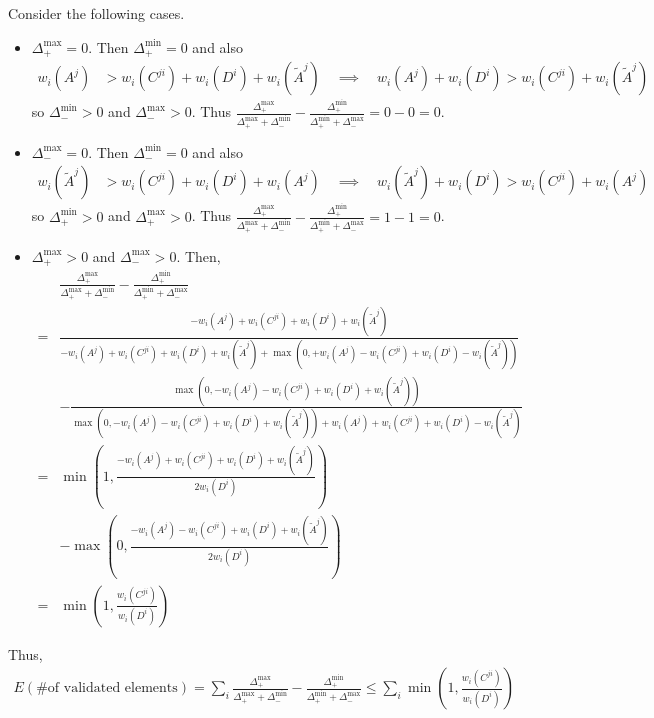 \documentclass{article} %
\begin{document}
Consider the following cases.
\begin{itemize}
\item $\Delta_+^{\max} = 0$. Then $\Delta_+^{\min} = 0$ and also
\begin{align*}
w_i(A^j) &> w_i(C^{ji})+ w_i(D^i) + w_i(\tilde{A}^j)
\quad\implies\quad w_i(A^j) + w_i(D^i) > w_i(C^{ji}) + w_i(\tilde{A}^j)
\end{align*}
so $\Delta_-^{\min} > 0$ and $\Delta_-^{\max}>0$.
Thus $\frac{\Delta_+^{\max}}{\Delta_+^{\max} + \Delta_-^{\min}} - \frac{\Delta_+^{\min}}{\Delta_+^{\min} + \Delta_-^{\max}} = 0-0 = 0$.

\item $\Delta_-^{\max} = 0$. Then $\Delta_-^{\min} = 0$ and also
\begin{align*}
w_i(\tilde{A}^j) &> w_i(C^{ji})+ w_i(D^i) + w_i(A^j)
\quad\implies\quad w_i(\tilde{A}^j) + w_i(D^i) > w_i(C^{ji}) + w_i(A^j)
\end{align*}
so $\Delta_+^{\min} > 0$ and $\Delta_+^{\max} > 0$.
Thus $\frac{\Delta_+^{\max}}{\Delta_+^{\max} + \Delta_-^{\min}} - \frac{\Delta_+^{\min}}{\Delta_+^{\min} + \Delta_-^{\max}} = 1-1 = 0$.

\item $\Delta_+^{\max}>0$ and $\Delta_-^{\max}>0$.
Then,
\begin{align*}
&\frac{\Delta_+^{\max}}{\Delta_+^{\max} + \Delta_-^{\min}} - \frac{\Delta_+^{\min}}{\Delta_+^{\min} + \Delta_-^{\max}} \\
=& \frac{- w_i(A^j) + w_i(C^{ji}) + w_i(D^i) + w_i(\tilde{A}^j)}{- w_i(A^j) + w_i(C^{ji}) + w_i(D^i) + w_i(\tilde{A}^j) + \max(0, + w_i(A^j) - w_i(C^{ji}) + w_i(D^i) - w_i(\tilde{A}^j))}\\
 &- \frac{\max(0, - w_i(A^j) -w_i(C^{ji}) + w_i(D^i) + w_i(\tilde{A}^j))}{\max(0, - w_i(A^j) -w_i(C^{ji}) + w_i(D^i) + w_i(\tilde{A}^j)) + w_i(A^j) + w_i(C^{ji}) + w_i(D^i) - w_i(\tilde{A}^j)}\\
=& \min\left(1,\frac{ - w_i(A^j) + w_i(C^{ji}) + w_i(D^i) + w_i(\tilde{A}^j)}{2w_i(D^i)}\right)\\
 & -\max\left(0,\frac{- w_i(A^j) - w_i(C^{ji}) + w_i(D^i) + w_i(\tilde{A}^j)}{2w_i(D^i)}\right)\\
=& \min\left(1,\frac{ w_i(C^{ji})}{w_i(D^i)}\right)
\end{align*}
\end{itemize}

Thus,
\begin{align*}
E(\text{\# of validated elements})
= \sum_i\frac{\Delta_+^{\max}}{\Delta_+^{\max} + \Delta_-^{\min}} - \frac{\Delta_+^{\min}}{\Delta_+^{\min} + \Delta_-^{\max}}
\leq \sum_i \min\left(1,\frac{ w_i(C^{ji})}{w_i(D^i)}\right)
\end{align*}
\end{document}
